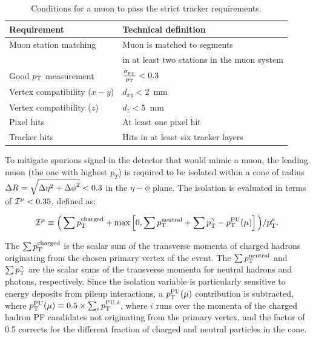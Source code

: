 \begin{table}[h]
  \caption{Conditions for a muon to pass the strict tracker requirements.}
    \begin{center}
    \begin{tabular}{l|l}
     \textbf{Requirement}         & \textbf{Technical definition}                 \\
      \hline
      Muon station matching          & Muon is matched to segments           \\
                                     & in at least two stations in the muon system        \\
      \hline                                                          
      Good $p_{\mathrm{T}}$ measurement         & $\frac{\sigma_{p_{\mathrm{T}}}}{p_{\mathrm{T}}} < 0.3$      \\
      \hline
      Vertex compatibility ($x-y$)   & $d_{xy} < 2$~mm                       \\
      \hline
      Vertex compatibility ($z$)     & $d_{z} < 5$~mm                        \\
      \hline
      Pixel hits                     & At least one pixel hit                \\
      \hline
      Tracker hits                   & Hits in at least six tracker layers   \\
      \hline
    \end{tabular}
    
    \label{tab:Tracker_High_pT}
    \end{center}
\end{table}


To mitigate spurious signal in the detector that would mimic a muon, the leading muon (the one with highest $p_T$) is required to be isolated within a cone of radius $\Delta R = \sqrt{\smash[b]{\Delta \eta}^2 + {\Delta \phi}^2}< 0.3$ in the $\eta - \phi$ plane. The isolation is evaluated in terms of ${\cal I}^{\mu} < 0.35$, defined as:


\begin{equation}
\label{eqn:pfiso}
{\cal I}^{\mu} \equiv \Big( \sum p_{\mathrm{T}}^\text{charged} +
                                 \max\left[ 0, \sum p_{\mathrm{T}}^\text{neutral}
                                 +
                                  \sum p_{\mathrm{T}}^{\gamma}
                                 - p_{\mathrm{T}}^\mathrm{PU}(\mu) \right] \Big)
                                 / p_{\mathrm{T}}^{\mu}.
\end{equation}


The $\sum p_{\mathrm{T}}^\text{charged}$ is the scalar sum of the transverse momenta of charged hadrons originating from the chosen primary vertex of the event. The $\sum p_{\mathrm{T}}^\text{neutral}$ and $\sum p_{\mathrm{T}}^{\gamma}$ are the scalar sums of the transverse momenta for neutral hadrons and photons, respectively.  Since the isolation variable is particularly sensitive to energy deposits from pileup interactions, a $p_{\mathrm{T}}^\text{PU}(\mu)$ contribution is subtracted, where $p_{\mathrm{T}}^\mathrm{PU}(\mu) \equiv 0.5 \times \sum_i p_{\mathrm{T}}^{\mathrm{PU}, i}$, where $i$ runs over the momenta of the charged hadron PF candidates not originating from the primary vertex, and the factor of 0.5 corrects for the different fraction of charged and neutral particles in the cone. 


